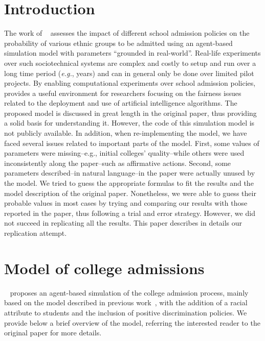 \section{Introduction}

The work of \citeauthor{reardon2018levels}~\cite{reardon2018levels} assesses the impact of different school admission policies on the probability of various ethnic groups to be admitted using an agent-based simulation model with parameters ``grounded in real-world''.
Real-life experiments over such sociotechnical systems are complex and costly to setup and run over a long time period (\emph{e.g.}, years) and can in general only be done over limited pilot projects. 
By enabling computational experiments over school admission policies, \citeauthor{reardon2018levels} provides a useful environment for researchers focusing on the fairness issues related to the deployment and use of artificial intelligence algorithms.
The proposed model is discussed in great length in the original paper, thus providing a solid basis for understanding it. 
However, the code of this simulation model is not publicly available. 
In addition, when re-implementing the model, we have faced several issues related to important parts of the model.
First, some values of parameters were missing--e.g., initial colleges' quality--while others were used inconsistently along the paper--such as affirmative actions.
Second, some parameters described--in natural language--in the paper were actually unused by the model. We tried to guess the appropriate formulas to fit the results and the model description of the original paper.
Nonetheless, we were able to guess their probable values in most cases by trying and comparing our results with those reported in the paper, thus following a trial and error strategy. 
However, we did not succeed in replicating all the
results.
This paper describes in details our replication attempt.

\section{Model of college admissions}

\citeauthor{reardon2018levels}~\cite{reardon2018levels} proposes an agent-based simulation of the college admission process, mainly based on the model described in previous work~\cite{reardon2016agent}, with the addition of a racial attribute to students and the inclusion of positive discrimination policies.
We provide below a brief overview of the model, referring the interested reader to the original paper for more details.

